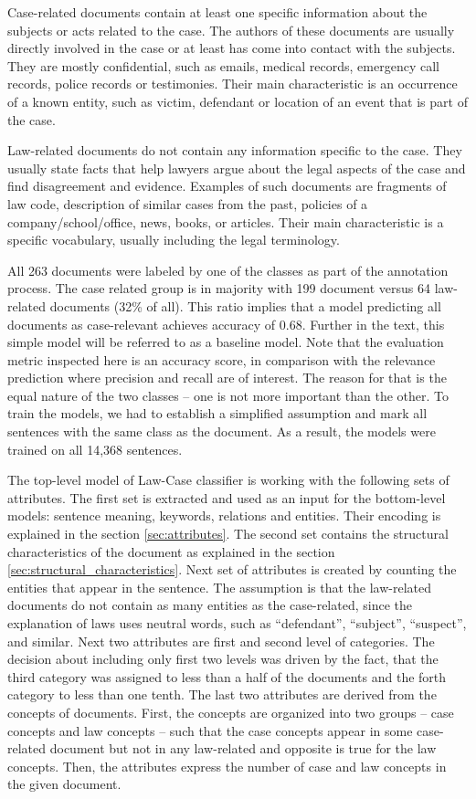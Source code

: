 \documentclass[
  digital, %
  notable,   %
  nolof,     %
  nolot,     %
]{fithesis3}
\begin{document}
Case-related documents contain at least one specific information about the subjects or acts related to the case. 
The authors of these documents are usually directly involved in the case or at least has come into contact with the subjects.
They are mostly confidential, such as emails, medical records, emergency call records, police records or testimonies.
Their main characteristic is an occurrence of a known entity, such as victim, defendant or location of an event that is part of the case.

Law-related documents do not contain any information specific to the case.
They usually state facts that help lawyers argue about the legal aspects of the case and find disagreement and evidence.
Examples of such documents are fragments of law code, description of similar cases from the past, policies of a company/school/office, news, books, or articles.
Their main characteristic is a specific vocabulary, usually including the legal terminology.

All 263 documents were labeled by one of the classes as part of the annotation process.
The case related group is in majority with 199 document versus 64 law-related documents (32\% of all).
This ratio implies that a model predicting all documents as case-relevant achieves accuracy of 0.68.
Further in the text, this simple model will be referred to as a baseline model.
Note that the evaluation metric inspected here is an accuracy score, in comparison with the relevance prediction where precision and recall are of interest.
The reason for that is the equal nature of the two classes -- one is not more important than the other.
To train the models, we had to establish a simplified assumption and mark all sentences with the same class as the document.
As a result, the models were trained on all 14,368 sentences.

The top-level model of Law-Case classifier is working with the following sets of attributes.
The first set is extracted and used as an input for the bottom-level models: sentence meaning, keywords, relations and entities.
Their encoding is explained in the section \ref{sec:attributes}.
The second set contains the structural characteristics of the document as explained in the section \ref{sec:structural_characteristics}.
Next set of attributes is created by counting the entities that appear in the sentence.
The assumption is that the law-related documents do not contain as many entities as the case-related, since the explanation of laws uses neutral words, such as ``defendant'', ``subject'', ``suspect'', and similar.
Next two attributes are first and second level of categories.
The decision about including only first two levels was driven by the fact, that the third category was assigned to less than a half of the documents and the forth category to less than one tenth.
The last two attributes are derived from the concepts of documents.
First, the concepts are organized into two groups -- case concepts and law concepts -- such that the case concepts appear in some case-related document but not in any law-related and opposite is true for the law concepts.
Then, the attributes express the number of case and law concepts in the given document.
\end{document}
